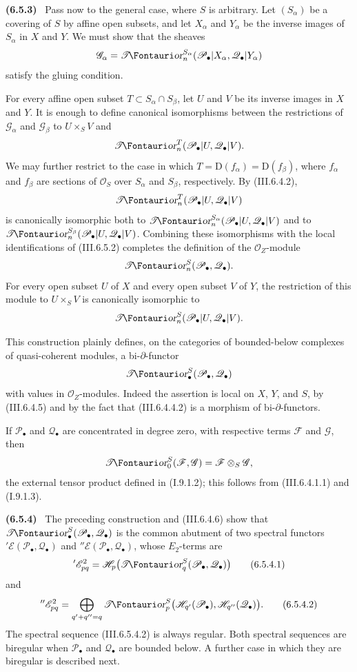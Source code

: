 \documentclass[10pt,oneside]{book}
\newcommand{\sh}[1]{\mathscr{#1}}
\newcommand{\shTor}{\sh{T}\textup{\kern-2.2pt{\Fontauri\slshape or}}}
\newcommand{\sref}[2][]{(#2)}
\newenvironment{env}[1][]{\par\medskip\noindent\textbf{(#1)}\ }{\par}
\begin{document}
\begin{env}[6.5.3]
\label{III.6.5.3}
Pass now to the general case, where $S$ is arbitrary.  Let
$(S_\alpha)$ be a covering of $S$ by affine open subsets, and let
$X_\alpha$ and $Y_\alpha$ be the inverse images of $S_\alpha$ in
$X$ and $Y$.  We must show that the sheaves
\[
  \sh G_\alpha
  =
  \shTor_n^{S_\alpha}
  (\sh P_\bullet|X_\alpha,\sh Q_\bullet|Y_\alpha)
\]
satisfy the gluing condition.

For every affine open subset
$T\subset S_\alpha\cap S_\beta$, let $U$ and $V$ be its inverse
images in $X$ and $Y$.  It is enough to define canonical
isomorphisms between the restrictions of $\sh G_\alpha$ and
$\sh G_\beta$ to $U\times_SV$ and
\[
  \shTor_n^T(\sh P_\bullet|U,\sh Q_\bullet|V).
\]
We may further restrict to the case in which
$T=\mathrm D(f_\alpha)=\mathrm D(f_\beta)$, where $f_\alpha$ and
$f_\beta$ are sections of $\sh O_S$ over $S_\alpha$ and
$S_\beta$, respectively.  By \sref{III.6.4.2},
\[
  \shTor_n^T(\sh P_\bullet|U,\sh Q_\bullet|V)
\]
is canonically isomorphic both to
$\shTor_n^{S_\alpha}(\sh P_\bullet|U,\sh Q_\bullet|V)$ and to
$\shTor_n^{S_\beta}(\sh P_\bullet|U,\sh Q_\bullet|V)$.
Combining these isomorphisms with the local identifications of
\sref{III.6.5.2} completes the definition of the
$\sh O_Z$-module
\[
  \shTor_n^S(\sh P_\bullet,\sh Q_\bullet).
\]
For every open subset $U$ of $X$ and every open subset $V$ of
$Y$, the restriction of this module to $U\times_SV$ is
canonically isomorphic to
\[
  \shTor_n^S(\sh P_\bullet|U,\sh Q_\bullet|V).
\]

This construction plainly defines, on the categories of
bounded-below complexes of quasi-coherent modules, a
bi-$\partial$-functor
\[
  \shTor_\bullet^S(\sh P_\bullet,\sh Q_\bullet)
\]
with values in $\sh O_Z$-modules.  Indeed the assertion is local
on $X$, $Y$, and $S$, by \sref{III.6.4.5} and by the fact that
\sref{III.6.4.4.2} is a morphism of bi-$\partial$-functors.

If $\sh P_\bullet$ and $\sh Q_\bullet$ are concentrated in degree
zero, with respective terms $\sh F$ and $\sh G$, then
\[
  \shTor_0^S(\sh F,\sh G)
  =
  \sh F\otimes_S\sh G,
\]
the external tensor product defined in \sref[I]{I.9.1.2}; this
follows from \sref{III.6.4.1.1} and \sref[I]{I.9.1.3}.
\end{env}

\begin{env}[6.5.4]
\label{III.6.5.4}
The preceding construction and \sref{III.6.4.6} show that
$\shTor_\bullet^S(\sh P_\bullet,\sh Q_\bullet)$ is the common abutment
of two spectral functors
$'\sh E(\sh P_\bullet,\sh Q_\bullet)$ and
$''\sh E(\sh P_\bullet,\sh Q_\bullet)$, whose $E_2$-terms are
\[
  '\sh E_{pq}^2
  =
  \sh H_p\bigl(\shTor_q^S(\sh P_\bullet,\sh Q_\bullet)\bigr)
  \tag{6.5.4.1}\label{III.6.5.4.1}
\]
and
\[
  ''\sh E_{pq}^2
  =
  \bigoplus_{q'+q''=q}
  \shTor_p^S
  \bigl(\sh H_{q'}(\sh P_\bullet),
        \sh H_{q''}(\sh Q_\bullet)\bigr).
  \tag{6.5.4.2}\label{III.6.5.4.2}
\]
The spectral sequence \sref{III.6.5.4.2} is always regular.  Both
spectral sequences are biregular when $\sh P_\bullet$ and
$\sh Q_\bullet$ are bounded below.  A further case in which they
are biregular is described next.
\end{env}
\end{document}
